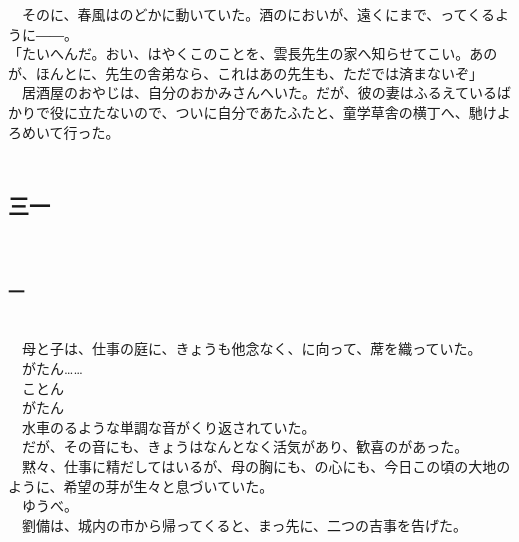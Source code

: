 \documentclass[
  paper=a5,
  fontsize=10pt,
  jafontsize=9.5pt,
  tate,                  %
  open_bracket_pos=nibu, %
]{jlreq}
\begin{document}
　そのに、春風はのどかに動いていた。酒のにおいが、遠くにまで、ってくるように――。\\


「たいへんだ。おい、はやくこのことを、雲長先生の家へ知らせてこい。あのが、ほんとに、先生の舎弟なら、これはあの先生も、ただでは済まないぞ」\\


　居酒屋のおやじは、自分のおかみさんへいた。だが、彼の妻はふるえているばかりで役に立たないので、ついに自分であたふたと、童学草舎の横丁へ、馳けよろめいて行った。\\

\\

\subsection{三一}

\\

\subsubsection{一}

\\


　母と子は、仕事の庭に、きょうも他念なく、に向って、蓆を織っていた。\\


　がたん……\\


　ことん\\


　がたん\\


　水車のるような単調な音がくり返されていた。\\


　だが、その音にも、きょうはなんとなく活気があり、歓喜のがあった。\\


　黙々、仕事に精だしてはいるが、母の胸にも、の心にも、今日この頃の大地のように、希望の芽が生々と息づいていた。\\


　ゆうべ。\\


　劉備は、城内の市から帰ってくると、まっ先に、二つの吉事を告げた。\\
\end{document}
